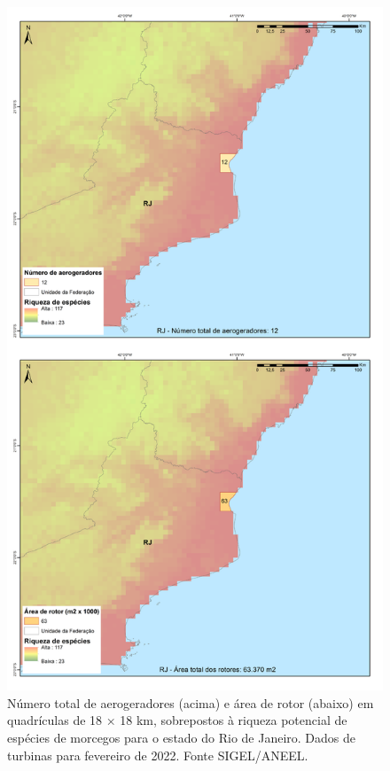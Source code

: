 \documentclass[
  oneside]{scrbook}
\begin{document}
\begin{figure}[H]

{\centering \includegraphics[width=0.75\linewidth]{imagens/cap09/Figura_9.14} 

}

\caption{Número total de aerogeradores (acima) e área de rotor (abaixo) em quadrículas de 18 × 18 km, sobrepostos à riqueza potencial de espécies de morcegos para o estado do Rio de Janeiro. Dados de turbinas para fevereiro de 2022. Fonte SIGEL/ANEEL.}\label{fig:79}
\end{figure}
\end{document}
